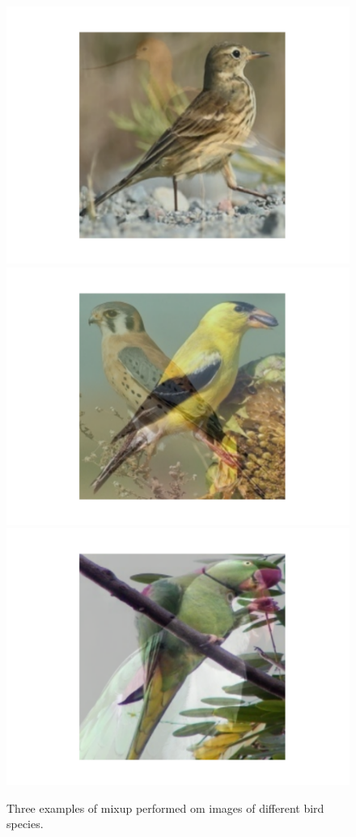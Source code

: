 \documentclass{article}
\begin{document}
\begin{figure}[!htb]
	\includegraphics[trim=3cm 2cm 3cm 3cm, width=\linewidth]{mixup1.pdf}
	\endminipage\hfill
	\includegraphics[trim=3cm 2cm 3cm 3cm, width=\linewidth]{mixup2.pdf}
	\endminipage\hfill
	\includegraphics[trim=3cm 2cm 3cm 3cm, width=\linewidth]{mixup3.pdf}
	\endminipage
	\caption{Three examples of mixup performed om images of different bird species.}
\end{figure}
\end{document}
